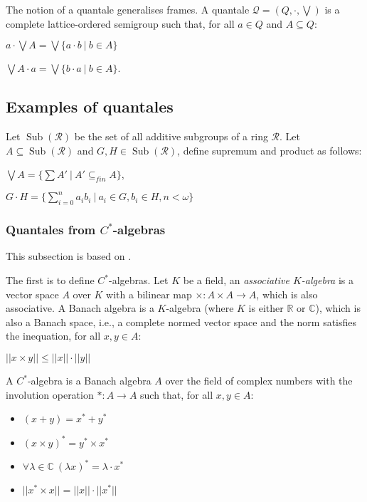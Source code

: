 \documentclass[a4paper]{article}
\theoremstyle{defin}
\theoremstyle{theorem}
\theoremstyle{claim}
\theoremstyle{prop}
\theoremstyle{lemma}
\theoremstyle{fact}
\theoremstyle{ex}
\theoremstyle{col}
\begin{document}
The notion of a quantale generalises frames. A quantale $\mathcal{Q} = (Q, \cdot, \bigvee)$ is a complete lattice-ordered semigroup such that, for all $a \in Q$ and $A \subseteq Q$:
\begin{center}
$a \cdot \bigvee A = \bigvee \{ a \cdot b \: | \: b \in A \}$

$\bigvee A \cdot a = \bigvee \{ b \cdot a \: | \: b \in A \}$.
\end{center}

\subsection{Examples of quantales}

Let $\operatorname{Sub}(\mathcal{R})$ be the set of all additive subgroups of a ring $\mathcal{R}$. Let $A \subseteq \operatorname{Sub}(\mathcal{R})$ and $G, H \in \operatorname{Sub}(\mathcal{R})$, define supremum and product as follows:
\begin{center}
$\bigvee A = \{ \sum A' \: | \: A' \subseteq_{fin} A \}$,

$G \cdot H = \{ \sum \limits_{i = 0}^n a_i b_i \: | \: a_i \in G, b_i \in H, n < \omega \}$
\end{center}

\subsubsection{Quantales from $C^{*}$-algebras}

This subsection is based on \cite{mulvey2001quantisation}.

The first is to define $C^{*}$-algebras. Let $K$ be a field, an \emph{associative $K$-algebra} is a vector space $A$ over $K$ with a bilinear map $\times : A \times A \to A$, which is also associative. A Banach algebra is a $K$-algebra (where $K$ is either $\mathbb{R}$ or $\mathbb{C}$), which is also a Banach space, i.e., a complete normed vector space and the norm satisfies the inequation, for all $x, y \in A$:
\begin{center}
$||x \times y|| \leq ||x|| \cdot ||y||$
\end{center}

A $C^{*}$-algebra is a Banach algebra $A$ over the field of complex numbers with the involution operation $* : A \to A$ such that, for all $x, y \in A$:
\begin{itemize}
\item $(x + y) = x^* + y^*$
\item $(x \times y)^* = y^* \times x^*$
\item $\forall \lambda \in \mathbb{C} \: (\lambda x)^* = \lambda \cdot x^*$
\item $||x^* \times x|| = ||x||\cdot||x^*||$
\end{itemize}
\end{document}
